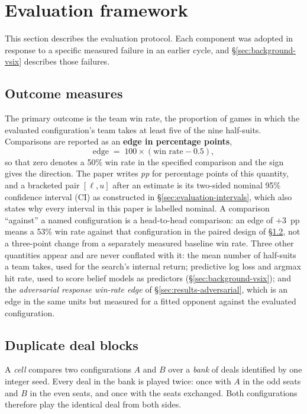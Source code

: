 \section{Evaluation framework}
\label{sec:evaluation}

This section describes the evaluation protocol. Each component was adopted in response to a
specific measured failure in an earlier cycle, and \S\ref{sec:background-vsix} describes those
failures.

\subsection{Outcome measures}
\label{sec:evaluation-measure}

The primary outcome is the team win rate, the proportion of games in which the evaluated
configuration's team takes at least five of the nine half-suits. Comparisons are reported as an
\textbf{edge in percentage points},
\[
  \text{edge} \;=\; 100 \times (\text{win rate} - 0.5),
\]
so that zero denotes a 50\% win rate in the specified comparison and the sign gives the direction.
The paper writes \emph{pp} for percentage points of this quantity, and a bracketed pair
$[\ell, u]$ after an estimate is its two-sided nominal 95\% confidence interval (CI) as
constructed in \S\ref{sec:evaluation-intervals}, which also states why every interval in this
paper is labelled nominal. A comparison ``against'' a named configuration is a head-to-head
comparison: an edge of $+3$~pp means a 53\% win rate against that configuration in the paired
design of \S\ref{sec:evaluation-duplicate}, not a three-point change from a separately measured
baseline win rate. Three other quantities appear and are never conflated with it: the mean number
of half-suits a team takes, used for the search's internal return; predictive log loss and argmax
hit rate, used to score belief models as predictors (\S\ref{sec:background-vsix}); and the
\emph{adversarial response win-rate edge} of \S\ref{sec:results-adversarial}, which is an edge in
the same units but measured for a fitted opponent against the evaluated configuration.

\subsection{Duplicate deal blocks}
\label{sec:evaluation-duplicate}

A \emph{cell} compares two configurations $A$ and $B$ over a \emph{bank} of deals identified by one
integer seed. Every deal in the bank is played twice: once with $A$ in the odd seats and $B$ in the
even seats, and once with the seats exchanged. Both configurations therefore play the identical deal
from both sides.


